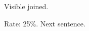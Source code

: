 \documentclass{article}
\begin{document}
Visible%
joined.

Rate: 25\%. %
Next sentence.
\end{document}
